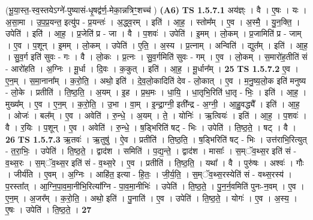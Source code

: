 \documentclass[17pt]{extarticle}
\begin{document}
                  \newline
                      (भू॒या॒स्त॒-स्व॒स्तयेऽग्ने॑-पुष्यासं-धृ॒षद्व॑र्ण॒-मेका॒न्नत्रिꣳ॒॒शच्च॑ )  \textbf{(A6)} \newline \newline
                                \textbf{ TS 1.5.7.1} \newline
                  अय॑ज्ञ्ः । वै । ए॒षः । यः । अ॒सा॒मा । उ॒प॒प्र॒यन्त॒ इत्यु॑प - प्र॒यन्तः॑ । अ॒द्ध्व॒रम् । इति॑ । आ॒ह॒ । स्तोम᳚म् । ए॒व । अ॒स्मै॒ । यु॒न॒क्ति॒ । उपेति॑ । इति॑ । आ॒ह॒ । प्र॒जेति॑ प्र - जा । वै । प॒शवः॑ । उपेति॑ । इ॒मम् । लो॒कम् । प्र॒जामिति॑ प्र - जाम् । ए॒व । प॒शून् । इ॒मम् । लो॒कम् । उपेति॑ । ए॒ति॒ । अ॒स्य । प्र॒त्नाम् । अन्विति॑ । द्युत᳚म् । इति॑ । आ॒ह॒ । सु॒व॒र्ग इति॑ सुवः - गः । वै । लो॒कः । प्र॒त्नः । सु॒व॒र्गमिति॑ सुवः - गम् । ए॒व । लो॒कम् । स॒मारो॑ह॒तीति॑ सं - आरो॑हति । अ॒ग्निः । मू॒र्धा । दि॒वः । क॒कुत् । इति॑ । आ॒ह॒ । मू॒र्धान᳚म् । \textbf{  25} \newline
                  \newline
                                \textbf{ TS 1.5.7.2} \newline
                  ए॒व । ए॒न॒म् । स॒मा॒नाना᳚म् । क॒रो॒ति॒ । अथो॒ इति॑ । दे॒व॒लो॒कादिति॑ देव - लो॒कात् । ए॒व । म॒नु॒ष्य॒लो॒क इति॑ मनुष्य - लो॒के । प्रतीति॑ । ति॒ष्ठ॒ति॒ । अ॒यम् । इ॒ह । प्र॒थ॒मः । धा॒यि॒ । धा॒तृभि॒रिति॑ धा॒तृ - भिः॒ । इति॑ । आ॒ह॒ । मुख्य᳚म् । ए॒व । ए॒न॒म् । क॒रो॒ति॒ । उ॒भा । वा॒म् । इ॒न्द्रा॒ग्नी॒ इती᳚न्द्र - अ॒ग्नी॒ । आ॒हु॒वद्ध्यै᳚ । इति॑ । आ॒ह॒ । ओजः॑ । बल᳚म् । ए॒व । अवेति॑ । रु॒न्धे॒ । अ॒यम् । ते॒ । योनिः॑ । ऋ॒त्वियः॑ । इति॑ । आ॒ह॒ । प॒शवः॑ । वै । र॒यिः । प॒शून् । ए॒व । अवेति॑ । रु॒न्धे॒ । ष॒ड्भिरिति॑ षट् - भिः । उपेति॑ । ति॒ष्ठ॒ते॒ । षट् । वै । \textbf{  26} \newline
                  \newline
                                \textbf{ TS 1.5.7.3} \newline
                  ऋ॒तवः॑ । ऋ॒तुषु॑ । ऐ॒व । प्रतीति॑ । ति॒ष्ठ॒ति॒ । ष॒ड्भिरिति॑ षट् - भिः । उत्त॑राभि॒रित्युत् - त॒रा॒भिः॒ । उपेति॑ । ति॒ष्ठ॒ते॒ । द्वाद॑श । समिति॑ । प॒द्य॒न्ते॒ । द्वाद॑श । मासाः᳚ । स॒म्ॅव॒थ्स॒र इति॑ सं - व॒थ्स॒रः । स॒म्ॅव॒थ्स॒र इति॑ सं - व॒थ्स॒रे । ए॒व । प्रतीति॑ । ति॒ष्ठ॒ति॒ । यथा᳚ । वै । पुरु॑षः । अश्वः॑ । गौः । जीर्य॑ति । ए॒वम् । अ॒ग्निः । आहि॑त॒ इत्या - हि॒तः॒ । जी॒र्य॒ति॒ । स॒॒म्ॅव॒थ्स॒रस्येति॑ सं - वथ्स॒रस्य॑ । प॒रस्ता᳚त् । आ॒ग्नि॒पा॒व॒मा॒नीभि॒रित्या᳚ग्नि - पा॒व॒मा॒नीभिः॑ । उपेति॑ । ति॒ष्ठ॒ते॒ । पु॒न॒र्न॒वमिति॑ पुनः-न॒वम् । ए॒व । ए॒न॒म् । अ॒जर᳚म् । क॒रो॒ति॒ । अथो॒ इति॑ । पु॒नाति॑ । ए॒व । उपेति॑ । ति॒ष्ठ॒ते॒ । योगः॑ । ए॒व । अ॒स्य॒ । ए॒षः । उपेति॑ । ति॒ष्ठ॒ते॒ । \textbf{  27} \newline
\end{document}
